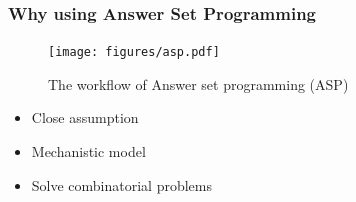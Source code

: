 \documentclass[8pt,usenames,dvipsnames]{beamer}
\begin{document}
\begin{frame}
\frametitle{Why using Answer Set Programming}
\centering
\begin{figure}[h]
\texttt{[image: figures/asp.pdf]}
\caption{The workflow of Answer set programming (ASP) \tiny \citep{Kaufmann2016GroundingAS}}
\end{figure}
\begin{block}{}
\begin{itemize}
\item Close assumption
\item Mechanistic model
\item Solve combinatorial problems
\end{itemize}

\end{block}
\end{frame}
\end{document}
